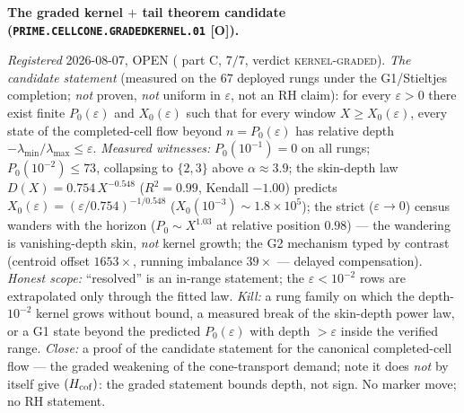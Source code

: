 \documentclass[11pt,a4paper]{article}
\begin{document}
\par\smallskip\noindent\textbf{The graded kernel $+$ tail
theorem candidate
(\texttt{PRIME.CELLCONE.\allowbreak GRADEDKERNEL.01} [O]).}
{\sloppy
\emph{Registered} 2026-08-07, OPEN
( part C, $7/7$, verdict
\textsc{kernel-graded}).  \emph{The candidate statement}
(measured on the $67$ deployed rungs under the G1/Stieltjes
completion; \emph{not} proven, \emph{not} uniform in
$\varepsilon$, not an RH claim): for every $\varepsilon > 0$
there exist finite $P_0(\varepsilon)$ and $X_0(\varepsilon)$
such that for every window $X \ge X_0(\varepsilon)$, every state
of the completed-cell flow beyond $n = P_0(\varepsilon)$ has
relative depth $-\lambda_{\min}/\lambda_{\max} \le \varepsilon$.
\emph{Measured witnesses:} $P_0(10^{-1}) = 0$ on all rungs;
$P_0(10^{-2}) \le 73$, collapsing to $\{2, 3\}$ above $\alpha
\approx 3.9$; the skin-depth law $D(X) = 0.754\,X^{-0.548}$
($R^2 = 0.99$, Kendall $-1.00$) predicts $X_0(\varepsilon) =
(\varepsilon/0.754)^{-1/0.548}$ ($X_0(10^{-3}) \sim
1.8\times10^{5}$); the strict ($\varepsilon \to 0$) census
wanders with the horizon ($P_0 \sim X^{1.03}$ at relative
position $0.98$) --- the wandering is vanishing-depth skin,
\emph{not} kernel growth; the G2 mechanism typed by contrast
(centroid offset $1653\times$, running imbalance $39\times$ ---
delayed compensation).  \emph{Honest scope:} ``resolved'' is an
in-range statement; the $\varepsilon < 10^{-2}$ rows are
extrapolated only through the fitted law.  \emph{Kill:} a rung
family on which the depth-$10^{-2}$ kernel grows without bound,
a measured break of the skin-depth power law, or a G1 state
beyond the predicted $P_0(\varepsilon)$ with depth $>
\varepsilon$ inside the verified range.  \emph{Close:} a proof
of the candidate statement for the canonical completed-cell flow
--- the graded weakening of the cone-transport demand; note it
does \emph{not} by itself give $(H_{\rm cof})$: the graded
statement bounds depth, not sign.  No marker move; no RH
statement.\par}
\end{document}

